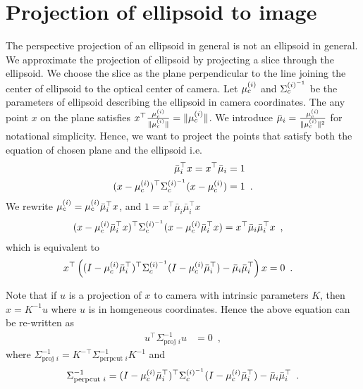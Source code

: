\section{Projection of ellipsoid to image}
\newcommand{\mubar}{\bar{\mu}_i}
The perspective projection of an ellipsoid in general is not an ellipsoid in
general. We approximate the projection of ellipsoid by projecting a slice
through the ellipsoid. We choose the slice as the plane perpendicular to the
line joining the center of ellipsoid to the optical center of camera. Let
${\mu^{(i)}_c}$ and $\Sigma^{(i)^{-1}}_c$ be the parameters of ellipsoid describing the ellipsoid
in camera coordinates. The any point $x$ on the plane satisfies
$x^\top\frac{{\mu^{(i)}_c}}{\|{\mu^{(i)}_c}\|} = \|{\mu^{(i)}_c}\|$. We introduce 
$\mubar = \frac{\muic}{\|\muic\|^2}$ for notational simplicity. Hence, we want
to project the points that satisfy both the equation of chosen plane and the 
ellipsoid i.e.
\begin{align}
  \mubar^\top x = x^\top\mubar &= 1\\ 
  (x-\muic)^\top\Sigmaicf(x-\muic) &= 1 \enspace.
\end{align}
We rewrite $\muic = \muic\mubar^\top x$, and $1 = x^\top\mubar \mubar^\top x$
\begin{align}
  (x-\muic\mubar^\top x)^\top\Sigmaicf(x-\muic\mubar^\top x) &= x^\top\mubar \mubar^\top x \enspace,
\end{align}
which is equivalent to 
\begin{align}
  x^\top\left((I-\muic\mubar^\top)^\top\Sigmaicf(I-\muic\mubar^\top) - \mubar \mubar^\top\right)x &= 0\enspace.
\end{align}

Note that if $u$ is a projection of $x$ to camera with intrinsic parameters
$K$, then $x = K^{-1}u$ where $u$ is in homgeneous coordinates. Hence the above equation can be re-written as
\newcommand{\Sproj}{\Sigma^{-1}_{\text{proj }i}}
\newcommand{\Sperpcut}{\Sigma^{-1}_{\text{perpcut }i}}
\begin{align}
  u^\top\Sproj u &= 0\enspace, 
\end{align}
where $\Sproj = K^{-\top}\Sperpcut K^{-1}$ and 
\begin{align}
  \Sperpcut = (I-\muic\mubar^\top)^\top\Sigmaicf(I-\muic\mubar^\top) - \mubar \mubar^\top \enspace.
\end{align}

